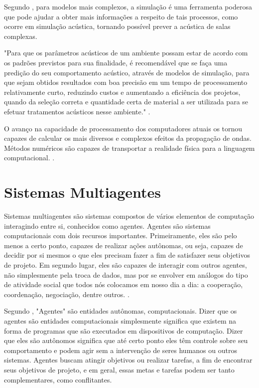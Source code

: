 Segundo , para modelos mais complexos, a simulação é uma ferramenta poderosa que pode ajudar a obter mais informações a respeito de tais processos, como ocorre em simulação acústica, tornando possível prever a acústica de salas complexas.

\begin{citacao}
\begin{normalsize}
"Para que os parâmetros acústicos de um ambiente possam estar de acordo com os padrões previstos para sua finalidade, é recomendável que se faça uma predição do seu comportamento acústico, através de modelos de simulação, para que sejam obtidos resultados com boa precisão em um tempo de processamento relativamente curto, reduzindo custos e aumentando a eficiência dos projetos, quando da seleção correta e quantidade certa de material a ser utilizada para se efetuar tratamentos acústicos nesse ambiente." \cite{bastos}.
\end{normalsize}
\end{citacao}

O avanço na capacidade de processamento dos computadores atuais os tornou capazes de calcular os mais diversos e complexos efeitos da propagação de ondas. Métodos numéricos são capazes de transportar a realidade física para a linguagem computacional. \cite{camilo}.

\section{Sistemas Multiagentes}

Sistemas multiagentes são sistemas compostos de vários elementos de computação interagindo entre si, conhecidos como agentes. Agentes são sistemas computacionais com dois recursos importantes. Primeiramente, eles são pelo menos a certo ponto, capazes de realizar ações autônomas, ou seja, capazes de decidir por si mesmos o que eles precisam fazer a fim de satisfazer seus objetivos de projeto. Em segundo lugar, eles são capazes de interagir com outros agentes, não simplesmente pela troca de dados, mas por se envolver em análogos do tipo de atividade social que todos nós colocamos em nosso dia a dia: a cooperação, coordenação, negociação, dentre outros. \cite{multiagentes}.

Segundo , "Agentes" são entidades autônomas, computacionais. Dizer que os agentes são entidades computacionais simplesmente significa que existem na forma de programas que são executados em dispositivos de computação. Dizer que eles são autônomos significa que até certo ponto eles têm controle sobre seu comportamento e podem agir sem a intervenção de seres humanos ou outros sistemas. Agentes buscam atingir objetivos ou realizar tarefas, a fim de encontrar seus objetivos de projeto, e em geral, essas metas e tarefas podem ser tanto complementares, como conflitantes.

